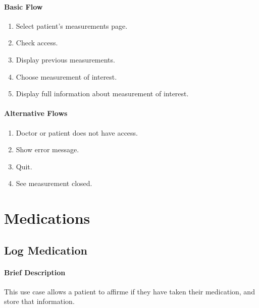 \documentclass{report}
\begin{document}
\begin{multicols}{2}
    \paragraph{Basic Flow}
    \begin{enumerate}
        \item Select patient's measurements page.
        \item Check access.
        \item Display previous measurements.
        \item Choose measurement of interest.
        \item Display full information about measurement of interest.
    \end{enumerate}
    \columnbreak
    
    \paragraph{Alternative Flows}
    \begin{enumerate}[label=A\arabic*.]
        \item Doctor or patient does not have access.
        \item Show error message.
        \item Quit.
        \item See measurement closed.
    \end{enumerate}
\end{multicols}

\vspace{1em}
\section{Medications}
\subsection{Log Medication}
\paragraph{Brief Description}
This use case allows a patient to affirme if they have taken their medication, and store that information.
\end{document}
